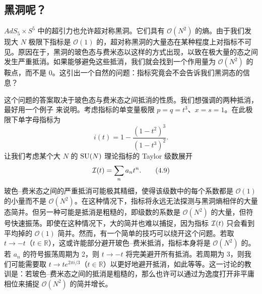 \subsection{黑洞呢？}
$AdS_5\times S^5$ 中的超引力也允许超对称黑洞。它们具有 $\mathcal{O}(N^2)$ 的熵。由于我们发现大 $N$ 极限下指标是 $\mathcal{O}(1)$ 的，超对称黑洞的大量态在某种程度上对指标不可见。原因在于，黑洞的玻色态与费米态以这样的方式出现，以致在极大量的态之间发生严重抵消。如果能够避免这些抵消，我们就会找到一个作用量为 $\mathcal{O}(N^2)$ 的鞍点，而不是 $0$。这引出一个自然的问题：指标究竟会不会告诉我们黑洞态的信息？

这个问题的答案取决于玻色态与费米态之间抵消的性质。我们想强调的两种抵消，最好用一个例子
来说明。考虑指标的单变量极限 $p=q=t^3$、$x=s=1$。在此极限下单字母指标为
\[
i(t)=1-\frac{(1-t^2)^3}{(1-t^3)^2} .
\tag{4.8}
\]
让我们考虑某个大 $N$ 的 $\operatorname{SU}(N)$ 理论指标的 Taylor 级数展开
\[
\mathcal{I}(t)=\sum_n a_n t^n .
\tag{4.9}
\]
玻色–费米态之间的严重抵消可能极其精细，使得该级数中的每个系数都是 $\mathcal{O}(1)$ 的小量而不是 $\mathcal{O}(N^2)$。在这种情况下，指标将永远无法探测与黑洞熵相伴的大量态简并。但另一种可能是抵消是粗糙的，即级数的系数是 $\mathcal{O}(N^2)$ 的大量，但符号快速振荡。即使在这种情况下，大的简并也难以捕捉，因为指标 $\mathcal{I}(t)$ 只会看到平均掉的 $\mathcal{O}(1)$ 简并。然而，有一个简单的技巧可以绕开这个问题。若取 $t\to-t$（$t\in\mathbb{R}$），这或许能部分避开玻色–费米抵消，指标本身将是 $\mathcal{O}(N^2)$ 的。若 $a_n$ 的符号振荡周期为 2，则 $t\to-t$ 将完美避开所有抵消。若周期为 3，则我们可能需要取 $t\to t e^{2\pi i/3}$（$t\in\mathbb{R}$）以更好地避开抵消，如此等等。这一讨论的教训是：若玻色–费米态之间的抵消是粗糙的，那么也许可以通过为逸度打开非平庸相位来捕捉 $\mathcal{O}(N^2)$ 的简并增长。

